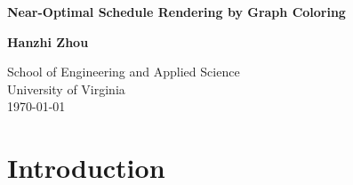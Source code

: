 \documentclass[12pt]{article}
\begin{document}
\begin{titlepage}
    \begin{center}
        \vspace*{1cm}
 
        \LARGE\textbf{Near-Optimal Schedule Rendering by Graph Coloring}
   
        \vspace{1.5cm}
 
        \textbf{Hanzhi Zhou}
 
        \vfill
        \vspace{0.8cm}

        \Large
        School of Engineering and Applied Science\\
        \vspace{0.2cm}
        University of Virginia\\
        \vspace{0.2cm}
        \today
        \vspace{1cm}
    \end{center}
    \clearpage
\end{titlepage}

\section{Introduction}
\end{document}
